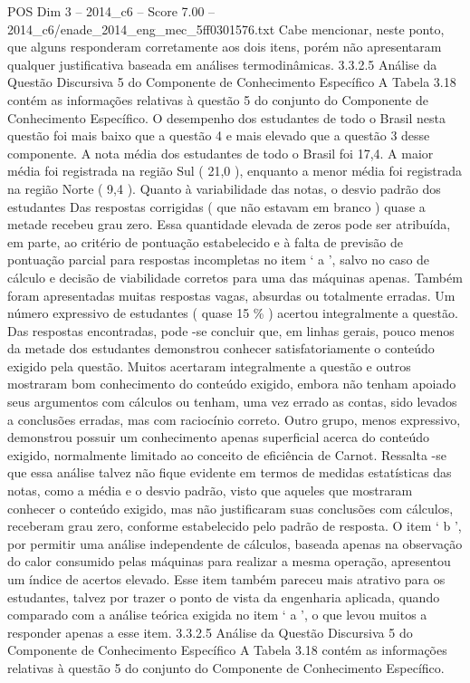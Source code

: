 \begin{textsample}{POS Dim 3 – 2014\_c6 – Score 7.00 – 2014\_c6/enade\_2014\_eng\_mec\_5ff0301576.txt}
Cabe mencionar, neste ponto, que alguns responderam corretamente aos dois itens, porém não apresentaram qualquer justificativa baseada em análises termodinâmicas. 3.3.2.5 Análise da Questão Discursiva 5 do Componente de Conhecimento Específico A Tabela 3.18 contém as informações relativas à questão 5 do conjunto do Componente de Conhecimento Específico.
O desempenho dos estudantes de todo o Brasil nesta questão foi mais baixo que a questão 4 e mais elevado que a questão 3 desse componente.
A nota média dos estudantes de todo o Brasil foi 17,4.
A maior média foi registrada na região Sul ( 21,0 ), enquanto a menor média foi registrada na região Norte ( 9,4 ).
Quanto à variabilidade das notas, o desvio padrão dos estudantes Das respostas corrigidas ( que não estavam em branco ) quase a metade recebeu grau zero.
Essa quantidade elevada de zeros pode ser atribuída, em parte, ao critério de pontuação estabelecido e à falta de previsão de pontuação parcial para respostas incompletas no item ‘ a ’, salvo no caso de cálculo e decisão de viabilidade corretos para uma das máquinas apenas.
Também foram apresentadas muitas respostas vagas, absurdas ou totalmente erradas.
Um número expressivo de estudantes ( quase 15 \% ) acertou integralmente a questão.
Das respostas encontradas, pode -se concluir que, em linhas gerais, pouco menos da metade dos estudantes demonstrou conhecer satisfatoriamente o conteúdo exigido pela questão.
Muitos acertaram integralmente a questão e outros mostraram bom conhecimento do conteúdo exigido, embora não tenham apoiado seus argumentos com cálculos ou tenham, uma vez errado as contas, sido levados a conclusões erradas, mas com raciocínio correto.
Outro grupo, menos expressivo, demonstrou possuir um conhecimento apenas superficial acerca do conteúdo exigido, normalmente limitado ao conceito de eficiência de Carnot.
Ressalta -se que essa análise talvez não fique evidente em termos de medidas estatísticas das notas, como a média e o desvio padrão, visto que aqueles que mostraram conhecer o conteúdo exigido, mas não justificaram suas conclusões com cálculos, receberam grau zero, conforme estabelecido pelo padrão de resposta.
O item ‘ b ’, por permitir uma análise independente de cálculos, baseada apenas na observação do calor consumido pelas máquinas para realizar a mesma operação, apresentou um índice de acertos elevado.
Esse item também pareceu mais atrativo para os estudantes, talvez por trazer o ponto de vista da engenharia aplicada, quando comparado com a análise teórica exigida no item ‘ a ’, o que levou muitos a responder apenas a esse item. 3.3.2.5 Análise da Questão Discursiva 5 do Componente de Conhecimento Específico A Tabela 3.18 contém as informações relativas à questão 5 do conjunto do Componente de Conhecimento Específico.

\end{textsample}
